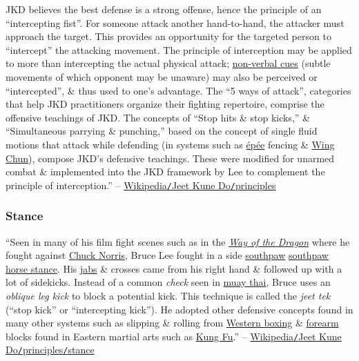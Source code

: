\documentclass[oneside]{book}
\numberwithin{equation}{section}
\begin{document}
JKD believes the best defense is a strong offense, hence the principle of an ``intercepting fist''. For someone attack another hand-to-hand, the attacker must approach the target. This provides an opportunity for the targeted person to ``intercept'' the attacking movement. The principle of interception may be applied to more than intercepting the actual physical attack; \href{https://en.wikipedia.org/wiki/Nonverbal_communication}{non-verbal cues} (subtle movements of which opponent may be unaware) may also be perceived or ``intercepted'', \& thus used to one's advantage. The ``5 ways of attack'', categories that help JKD practitioners organize their fighting repertoire, comprise the offensive teachings of JKD. The concepts of ``Stop hits \& stop kicks,'' \& ``Simultaneous parrying \& punching,'' based on the concept of single fluid motions that attack while defending (in systems such as \href{https://en.wikipedia.org/wiki/%C3%89p%C3%A9e}{\'ep\'ee} fencing \& \href{https://en.wikipedia.org/wiki/Wing_Chun}{Wing Chun}), compose JKD's defensive teachings. These were modified for unarmed combat \& implemented into the JKD framework by Lee to complement the principle of interception.'' -- \href{https://en.wikipedia.org/wiki/Jeet_Kune_Do#Principles}{Wikipedia\texttt{/}Jeet Kune Do\texttt{/}principles}

\subsubsection{Stance}
``Seen in many of his film fight scenes such as in the \href{https://en.wikipedia.org/wiki/Way_of_the_Dragon}{\textit{Way of the Dragon}} where he fought against \href{https://en.wikipedia.org/wiki/Chuck_Norris}{Chuck Norris}, Bruce Lee fought in a side \href{https://en.wikipedia.org/wiki/Southpaw_stance}{southpaw} \href{https://en.wikipedia.org/wiki/Horse_stance}{southpaw horse stance}. His \href{https://en.wikipedia.org/wiki/Jab}{jabs} \& crosses came from his right hand \& followed up with a lot of sidekicks. Instead of a common \textit{check} seen in \href{https://en.wikipedia.org/wiki/Muay_thai}{muay thai}, Bruce uses an \textit{oblique leg kick} to block a potential kick. This technique is called the \textit{jeet tek} (``stop kick'' or ``intercepting kick''). He adopted other defensive concepts found in many other systems such as slipping \& rolling from \href{https://en.wikipedia.org/wiki/Boxing}{Western boxing} \& \href{https://en.wikipedia.org/wiki/Forearm}{forearm} blocks found in Eastern martial arts such as \href{https://en.wikipedia.org/wiki/Kung_Fu}{Kung Fu}.'' -- \href{https://en.wikipedia.org/wiki/Jeet_Kune_Do#Stance}{Wikipedia\texttt{/}Jeet Kune Do\texttt{/}principles\texttt{/}stance}
\end{document}
